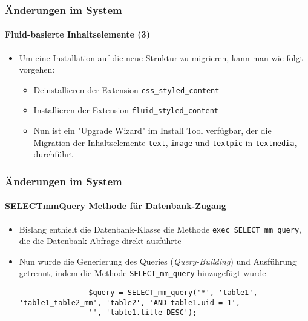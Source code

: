 \begin{frame}[fragile]
	\frametitle{Änderungen im System}
	\framesubtitle{Fluid-basierte Inhaltselemente (3)}

	\begin{itemize}

		\item Um eine Installation auf die neue Struktur zu migrieren, kann man wie folgt vorgehen:

			\begin{itemize}

				\item Deinstallieren der Extension \texttt{css\_styled\_content}

				\item Installieren der Extension \texttt{fluid\_styled\_content}

				\item Nun ist ein "Upgrade Wizard" im Install Tool verfügbar,
					der die Migration der Inhaltselemente \texttt{text}, \texttt{image}
					und \texttt{textpic} in \texttt{textmedia}, durchführt

			\end{itemize}
	\end{itemize}

\end{frame}



\begin{frame}[fragile]
	\frametitle{Änderungen im System}
	\framesubtitle{SELECTmmQuery Methode für Datenbank-Zugang}

	\lstset{basicstyle=\tiny\ttfamily}

	\begin{itemize}

		\item Bislang enthielt die Datenbank-Klasse die Methode \texttt{exec\_SELECT\_mm\_query},
			die die Datenbank-Abfrage direkt ausführte

		\item Nun wurde die Generierung des Queries (\textit{Query-Building}) und Ausführung getrennt,
			indem die Methode \texttt{SELECT\_mm\_query} hinzugefügt wurde

			\begin{lstlisting}
				$query = SELECT_mm_query('*', 'table1', 'table1_table2_mm', 'table2', 'AND table1.uid = 1',
				'', 'table1.title DESC');
			\end{lstlisting}

	\end{itemize}

\end{frame}

